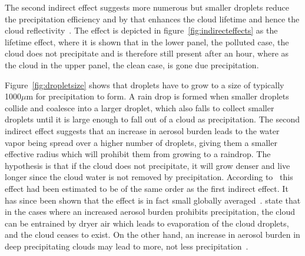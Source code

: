 The second indirect effect suggests more numerous but smaller droplets reduce the precipitation efficiency and by that enhances the cloud lifetime and hence the cloud reflectivity~\citep{Albrecht1989}. The effect is depicted in figure~\ref{fig:indirecteffects} as the lifetime effect, where it is shown that in the lower panel, the polluted case, the cloud does not precipitate and is therefore still present after an hour, where as the cloud in the upper panel, the clean case, is gone due precipitation.

Figure~\ref{fig:dropletsize} shows that droplets have to grow to a size of typically 1000$\mu\text{m}$ for precipitation to form. A rain drop is formed when smaller droplets collide and coalesce into a larger droplet, which also falls to collect smaller droplets until it is large enough to fall out of a cloud as precipitation. The second indirect effect suggests that an increase in aerosol burden leads to the water vapor being spread over a higher number of droplets, giving them a smaller effective radius which will prohibit them from growing to a raindrop. The hypothesis is that if the cloud does not precipitate, it will grow denser and live longer since the cloud water is not removed by precipitation. According to~\citet{Lohmann2005} this effect had been estimated to be of the same order as the first indirect effect. It has since been shown that the effect is in fact small globally averaged~\citep{Stevens2009}. \citet{Stevens2009} state that in the cases where an increased aerosol burden prohibits precipitation, the cloud can be entrained by dryer air which leads to evaporation of the cloud droplets, and the cloud ceases to exist. On the other hand, an increase in aerosol burden in deep precipitating clouds may lead to more, not less precipitation~\citep{Stevens2008}.


